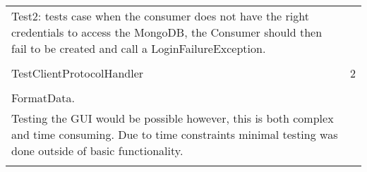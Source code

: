 \documentclass[oneside, english, final]{design}
\begin{document}
\begin{tabular}{|p{}p{}}
      Test2: tests case when the consumer does not have the right credentials to access the MongoDB, the Consumer should then fail to be created and call a LoginFailureException. \\ \\
      TestClientProtocolHandler & 2                                                                                                                                                \\ \\
      FormatData.               &                                                                                                                                                  \\ Testing the GUI would be possible however, this is both complex and time consuming. Due to time constraints minimal testing was done outside of basic functionality.\\ \\
\end{tabular}
\end{document}
